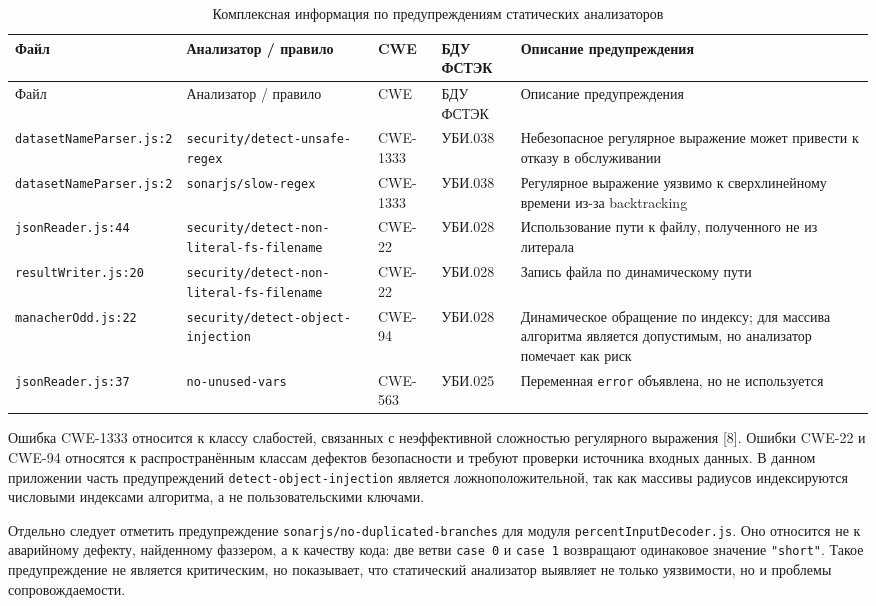 \noindent
\begingroup
\centering
\small
\begin{longtable}[c]{|p{3.6cm}|p{2.8cm}|p{2.8cm}|p{2.2cm}|p{3.1cm}|}
    \caption{Комплексная информация по предупреждениям статических анализаторов}
    \label{tab:static-results}
    \\
    \hline
    Файл & Анализатор / правило & CWE & БДУ ФСТЭК & Описание предупреждения \\ \hline
    \endfirsthead
    \hline
    Файл & Анализатор / правило & CWE & БДУ ФСТЭК & Описание предупреждения \\ \hline
    \endhead
    \hline
    \texttt{datasetNameParser.js:2} & \texttt{security/detect-unsafe-regex} & CWE-1333 & УБИ.038 & Небезопасное регулярное выражение может привести к отказу в обслуживании \\ \hline
    \texttt{datasetNameParser.js:2} & \texttt{sonarjs/slow-regex} & CWE-1333 & УБИ.038 & Регулярное выражение уязвимо к сверхлинейному времени из-за backtracking \\ \hline
    \texttt{jsonReader.js:44} & \texttt{security/detect-non-literal-fs-filename} & CWE-22 & УБИ.028 & Использование пути к файлу, полученного не из литерала \\ \hline
    \texttt{resultWriter.js:20} & \texttt{security/detect-non-literal-fs-filename} & CWE-22 & УБИ.028 & Запись файла по динамическому пути \\ \hline
    \texttt{manacherOdd.js:22} & \texttt{security/detect-object-injection} & CWE-94 & УБИ.028 & Динамическое обращение по индексу; для массива алгоритма является допустимым, но анализатор помечает как риск \\ \hline
    \texttt{jsonReader.js:37} & \texttt{no-unused-vars} & CWE-563 & УБИ.025 & Переменная \texttt{error} объявлена, но не используется \\ \hline
\end{longtable}
\normalsize
\endgroup

Ошибка CWE-1333 относится к классу слабостей, связанных с неэффективной
сложностью регулярного выражения [8]. Ошибки CWE-22 и CWE-94 относятся к
распространённым классам дефектов безопасности и требуют проверки источника
входных данных. В данном приложении часть предупреждений
\texttt{detect-object-injection} является ложноположительной, так как массивы
радиусов индексируются числовыми индексами алгоритма, а не пользовательскими
ключами.

Отдельно следует отметить предупреждение \texttt{sonarjs/no-duplicated-branches}
для модуля \texttt{percentInputDecoder.js}. Оно относится не к аварийному дефекту,
найденному фаззером, а к качеству кода: две ветви \texttt{case 0} и \texttt{case 1}
возвращают одинаковое значение \texttt{"short"}. Такое предупреждение не является
критическим, но показывает, что статический анализатор выявляет не только
уязвимости, но и проблемы сопровождаемости.

